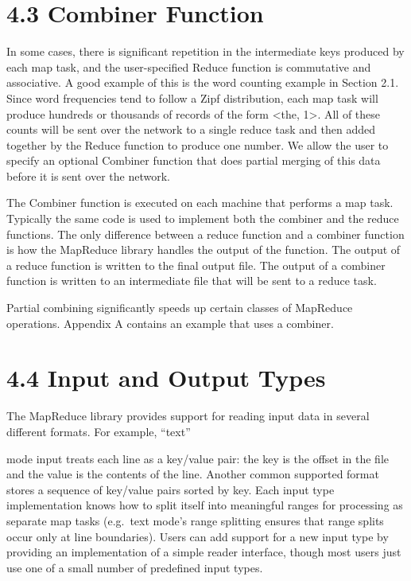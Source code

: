 \documentclass[
]{article}
\begin{document}
\section{4.3 Combiner Function}\label{combiner-function}

In some cases, there is significant repetition in the intermediate keys
produced by each map task, and the user-specified Reduce function is
commutative and associative. A good example of this is the word counting
example in Section 2.1. Since word frequencies tend to follow a Zipf
distribution, each map task will produce hundreds or thousands of
records of the form \textless the, 1\textgreater. All of these counts
will be sent over the network to a single reduce task and then added
together by the Reduce function to produce one number. We allow the user
to specify an optional Combiner function that does partial merging of
this data before it is sent over the network.

The Combiner function is executed on each machine that performs a map
task. Typically the same code is used to implement both the combiner and
the reduce functions. The only difference between a reduce function and
a combiner function is how the MapReduce library handles the output of
the function. The output of a reduce function is written to the final
output file. The output of a combiner function is written to an
intermediate file that will be sent to a reduce task.

Partial combining significantly speeds up certain classes of MapReduce
operations. Appendix A contains an example that uses a combiner.

\section{4.4 Input and Output Types}\label{input-and-output-types}

The MapReduce library provides support for reading input data in several
different formats. For example, ``text''

mode input treats each line as a key/value pair: the key is the offset
in the file and the value is the contents of the line. Another common
supported format stores a sequence of key/value pairs sorted by key.
Each input type implementation knows how to split itself into meaningful
ranges for processing as separate map tasks (e.g.~text mode's range
splitting ensures that range splits occur only at line boundaries).
Users can add support for a new input type by providing an
implementation of a simple reader interface, though most users just use
one of a small number of predefined input types.
\end{document}
